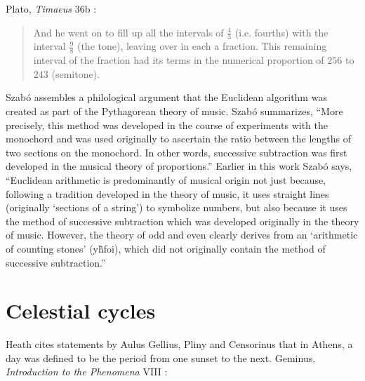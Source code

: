\documentclass{article}
\begin{document}
Plato, {\em Timaeus} 36b \cite[pp.~71--72]{timaeus}:

\begin{quote}
And he went on to fill up all the intervals of $\frac{4}{3}$ (i.e. fourths) with the interval $\frac{9}{8}$ (the tone), leaving over in each a fraction.
This remaining interval of the fraction had its terms in the numerical proportion of $256$ to $243$ (semitone).
\end{quote}

Szab\'o \cite{szabo} assembles a philological argument that the Euclidean algorithm was created
as part of the Pythagorean theory of music. Szab\'o \cite[p.~136, Chapter 2.8]{szabo} summarizes, ``More precisely, 
this method was developed in the course of experiments with the monochord and was used originally to ascertain the ratio
between the lengths of two sections on the monochord. In other words, successive subtraction was first developed in the musical
theory of proportions.'' Earlier in this work Szab\'o \cite[pp.~28--29]{szabo} says, ``Euclidean arithmetic is predominantly of musical origin
not just because, following a tradition developed in the theory of music, it uses straight lines (originally `sections of a string') to symbolize numbers, but also because
it uses the method of successive subtraction which was developed originally in the theory of music. However, the theory of odd and even clearly derives from
an `arithmetic of counting stones' (\textgreek{y\~hfoi}), which did not originally contain the method of successive subtraction.''





\section{Celestial cycles}
Heath \cite[p.~284]{aristarchus} cites statements by
Aulus Gellius, Pliny and Censorinus that in Athens, 
a day was defined to be the period from one sunset to the next.
Geminus, {\em Introduction to the Phenomena} VIII \cite[pp.~284--285]{aristarchus}:
\end{document}
